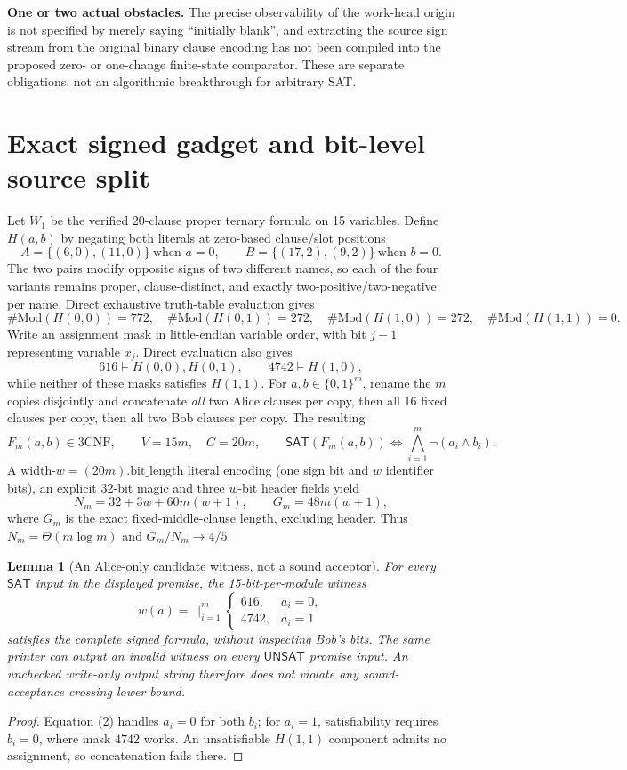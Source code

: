 \documentclass[11pt]{article}
\newtheorem{lemma}[theorem]{Lemma}
\newcommand{\SAT}{\mathsf{SAT}}
\newcommand{\UNSAT}{\mathsf{UNSAT}}
\begin{document}
\textbf{One or two actual obstacles.} The precise observability of the work-head origin is not specified by merely saying ``initially blank'', and extracting the source sign stream from the original binary clause encoding has not been compiled into the proposed zero- or one-change finite-state comparator. These are separate obligations, not an algorithmic breakthrough for arbitrary SAT.

\section{Exact signed gadget and bit-level source split}
Let $W_1$ be the verified 20-clause proper ternary formula on 15 variables. Define $H(a,b)$ by negating both literals at zero-based clause/slot positions
\[
   A=\{(6,0),(11,0)\}\ \text{when }a=0,\qquad
   B=\{(17,2),(9,2)\}\ \text{when }b=0.
\]
The two pairs modify opposite signs of two different names, so each of the four variants remains proper, clause-distinct, and exactly two-positive/two-negative per name. Direct exhaustive truth-table evaluation gives
\[
 \#\mathrm{Mod}(H(0,0))=772,\quad
 \#\mathrm{Mod}(H(0,1))=272,\quad
 \#\mathrm{Mod}(H(1,0))=272,\quad
 \#\mathrm{Mod}(H(1,1))=0.                 \tag{1}
\]
Write an assignment mask in little-endian variable order, with bit $j-1$ representing variable $x_j$. Direct evaluation also gives
\[
 616\models H(0,0),H(0,1),\qquad
 4742\models H(1,0),                                    \tag{2}
\]
while neither of these masks satisfies $H(1,1)$. For $a,b\in\{0,1\}^m$, rename the $m$ copies disjointly and concatenate \emph{all} two Alice clauses per copy, then all 16 fixed clauses per copy, then all two Bob clauses per copy. The resulting
\[
 F_m(a,b)\in\mathrm{3CNF},\qquad V=15m,\quad C=20m,
 \qquad \SAT(F_m(a,b))\iff \bigwedge_{i=1}^m\neg(a_i\land b_i). \tag{3}
\]
A width-$w=(20m).\mathrm{bit\_length}$ literal encoding (one sign bit and $w$ identifier bits), an explicit 32-bit magic and three $w$-bit header fields yield
\[
 N_m=32+3w+60m(w+1),\qquad G_m=48m(w+1),                \tag{4}
\]
where $G_m$ is the exact fixed-middle-clause length, excluding header. Thus $N_m=\Theta(m\log m)$ and $G_m/N_m\to4/5$.

\begin{lemma}[An Alice-only candidate witness, not a sound acceptor]
For every $\SAT$ input in the displayed promise, the 15-bit-per-module witness
\[
  w(a)=\mathop{\|}_{i=1}^m
  \begin{cases}616,&a_i=0,\\4742,&a_i=1\end{cases}
\]
satisfies the complete signed formula, without inspecting Bob's bits. The same printer can output an invalid witness on every $\UNSAT$ promise input. An unchecked write-only output string therefore does not violate any sound-acceptance crossing lower bound.
\end{lemma}
\begin{proof}Equation (2) handles $a_i=0$ for both $b_i$; for $a_i=1$, satisfiability requires $b_i=0$, where mask $4742$ works. An unsatisfiable $H(1,1)$ component admits no assignment, so concatenation fails there.\end{proof}
\end{document}
